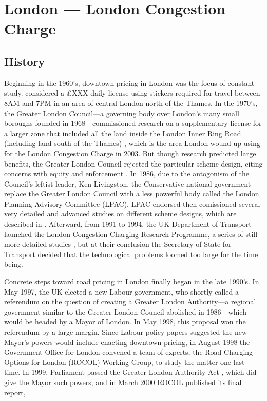 \section{London --- London Congestion Charge}

\subsection{History}

Beginning in the 1960's, downtown pricing in London was the focus of constant study. \citet{Thomson1967a} considered a \pounds XXX daily license using stickers required for travel between 8AM and 7PM in an area of central London north of the Thames. In the 1970's, the Greater London Council---a governing body over London's many small boroughs founded in 1968---commissioned research on a supplementary license for a larger zone that included all the land inside the London Inner Ring Road (including land south of the Thames) \citep{may1975}, which is the area London wound up using for the London Congestion Charge in 2003. But though research predicted large benefits, the Greater London Council rejected the particular scheme design, citing concerns with equity and enforcement \citep{Richards2006}. In 1986, due to the antogonism of the Council's leftist leader, Ken Livingston, the Conservative national government replace the Greater London Council with a less powerful body called the London Planning Advisory Committee (LPAC). LPAC endorsed  then comissioned several very detailed and advanced studies on different scheme designs, which are described in \citet[p. 51-54]{Gomez-Ibanez1994}. Afterward, from 1991 to 1994, the UK Department of Transport launched the London Congestion Charging Research Programme, a series of still more detailed studies \citep{MVA1995,Richards1996}, but at their conclusion the Secretary of State for Transport decided that the technological problems loomed too large for the time being.

Concrete steps toward road pricing in London finally began in the late 1990's. In May 1997, the UK elected a new Labour government, who shortly called a referendum on the question of creating a Greater London Authority---a regional government similar to the Greater London Council abolished in 1986---which would be headed by a Mayor of London. In May 1998, this proposal won the referendum by a large margin. Since Labour policy papers suggested the new Mayor's powers would include enacting downtown pricing, in August 1998 the Government Office for London convened a team of experts, the Road Charging Options for London (ROCOL) Working Group, to study the matter one last time. In 1999, Parliament passed the Greater London Authority Act \citep{Parliament1999}, which did give the Mayor such powers; and in March 2000 ROCOL published its final report, \citep{ROCOL2000}.

